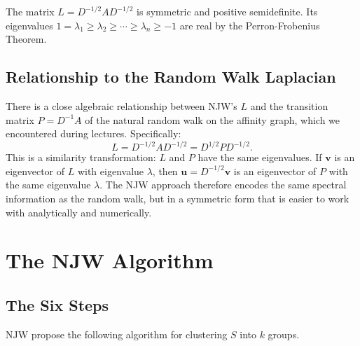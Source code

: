 \documentclass[11pt]{article}
\theoremstyle{plain}
\theoremstyle{definition}
\begin{document}
The matrix $L = D^{-1/2}AD^{-1/2}$ is symmetric and positive semidefinite. Its eigenvalues $1 = \lambda_1 \geq \lambda_2 \geq \cdots \geq \lambda_n \geq -1$ are real by the Perron-Frobenius Theorem.

\subsection{Relationship to the Random Walk Laplacian}

There is a close algebraic relationship between NJW's $L$ and the transition matrix $P = D^{-1}A$ of the natural random walk on the affinity graph, which we encountered during lectures. Specifically:
\begin{equation}
    L = D^{-1/2} A D^{-1/2} = D^{1/2} P D^{-1/2}.
\end{equation}
This is a similarity transformation: $L$ and $P$ have the same eigenvalues. If $\mathbf{v}$ is an eigenvector of $L$ with eigenvalue $\lambda$, then $\mathbf{u} = D^{-1/2}\mathbf{v}$ is an eigenvector of $P$ with the same eigenvalue $\lambda$. The NJW approach therefore encodes the same spectral information as the random walk, but in a symmetric form that is easier to work with analytically and numerically.

\section{The NJW Algorithm}

\subsection{The Six Steps}

NJW propose the following algorithm for clustering $S$ into $k$ groups.
\end{document}
